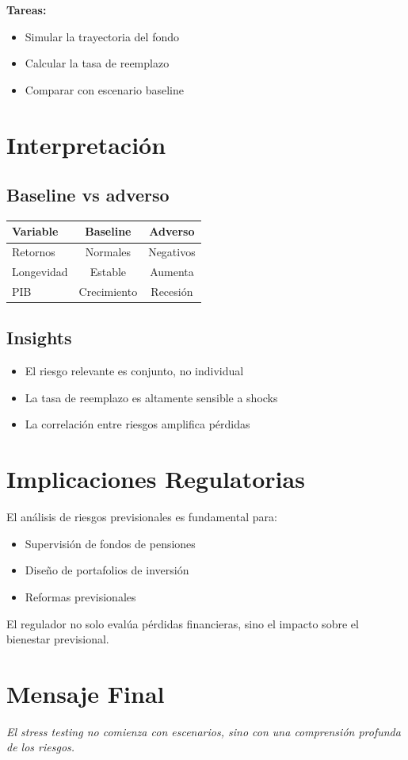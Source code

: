 \documentclass[12pt]{article}
\begin{document}
\textbf{Tareas:}
\begin{itemize}
\item Simular la trayectoria del fondo
\item Calcular la tasa de reemplazo
\item Comparar con escenario baseline
\end{itemize}

\section{Interpretación}

\subsection{Baseline vs adverso}

\begin{center}
\begin{tabular}{lcc}
\toprule
Variable & Baseline & Adverso \\
\midrule
Retornos & Normales & Negativos \\
Longevidad & Estable & Aumenta \\
PIB & Crecimiento & Recesión \\
\bottomrule
\end{tabular}
\end{center}

\subsection{Insights}

\begin{itemize}
\item El riesgo relevante es conjunto, no individual
\item La tasa de reemplazo es altamente sensible a shocks
\item La correlación entre riesgos amplifica pérdidas
\end{itemize}

\section{Implicaciones Regulatorias}

El análisis de riesgos previsionales es fundamental para:

\begin{itemize}
\item Supervisión de fondos de pensiones
\item Diseño de portafolios de inversión
\item Reformas previsionales
\end{itemize}

El regulador no solo evalúa pérdidas financieras, sino el impacto sobre el bienestar previsional.

\section{Mensaje Final}

\begin{center}
\textit{El stress testing no comienza con escenarios, sino con una comprensión profunda de los riesgos.}
\end{center}
\end{document}

